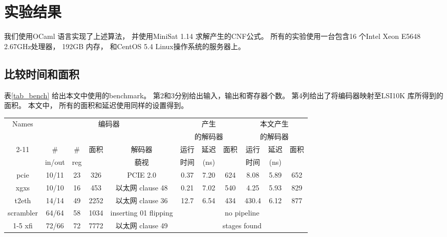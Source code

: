 \section{实验结果}\label{sec_exp}
我们使用OCaml 语言实现了上述算法，
并使用MiniSat 1.14 \cite{EXTSAT}求解产生的CNF公式。
所有的实验使用一台包含16 个Intel Xeon E5648 2.67GHz处理器，
192GB 内存， 和CentOS 5.4 Linux操作系统的服务器上。

\subsection{比较时间和面积}
表\ref{tab_bench} 给出本文中使用的benchmark。
第2和3分别给出输入，输出和寄存器个数。
第4列给出了将编码器映射至LSI10K 库所得到的面积。
本文中，
所有的面积和延迟使用同样的设置得到。


\begin{table*}[t]
\caption{Benchmark和实验结果}
\begin{tabular}{|c|c|c|c|c|c|c|c|c|c|c|}
\hline
 Names     & \multicolumn{4}{|c|}{编码器}                                        &   \multicolumn{3}{|c|}{\cite{ShenTCAD11}产生}      &   \multicolumn{3}{|c|}{本文产生} \\
           & \multicolumn{4}{|c|}{}                                              &   \multicolumn{3}{|c|}{的解码器}                   &   \multicolumn{3}{|c|}{的解码器} \\\cline{2-11}
           &    \#   &   \#    &面积  & 解码器                                   &运行 &延迟 &面积                                    &运行 &延迟 &面积\\
           & in/out  &  reg    &      &   藐视                                   &时间 &(ns) &                                        &时间 &(ns) &    \\\hline\hline
 pcie      & 10/11   & 23      & 326  &PCIE 2.0 \cite{pcie21}                    &0.37 &7.20 &624                                     &8.08 & 5.89&652 \\\hline
 xgxs      & 10/10   & 16      & 453  &     以太网   clause 48 \cite{IEEE8023_S4}&0.21 &7.02 &540                                     &4.25 & 5.93&829 \\\hline
 t2eth     & 14/14   & 49      & 2252 &    以太网   clause 36 \cite{IEEE8023_S4} &12.7 &6.54 &434                                     &430.4& 6.12&877 \\\hline
scrambler  &64/64    & 58      & 1034 & inserting 01 flipping                    &     \multicolumn{6}{|c|}{no pipeline }\\\cline{1-5}
 xfi       & 72/66   & 72      & 7772 &     以太网   clause 49 \cite{IEEE8023_S4}&     \multicolumn{6}{|c|}{stages found}\\\hline
\end{tabular}\label{tab_bench}
\end{table*}





